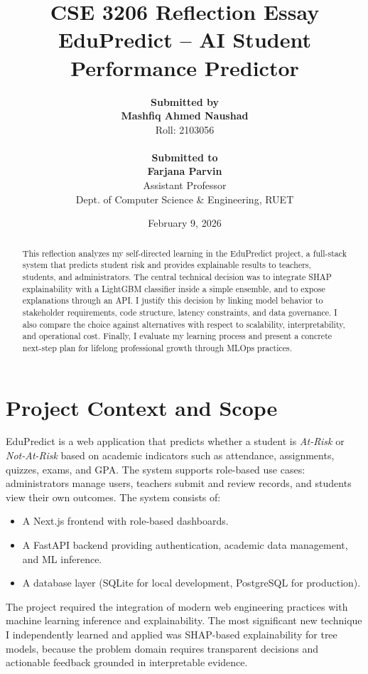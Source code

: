 \documentclass[12pt]{article}
\title{\textbf{CSE 3206 Reflection Essay} \\[0.5cm] EduPredict -- AI Student Performance Predictor}
\author{\textbf{Submitted by}\\\textbf{Mashfiq Ahmed Naushad}\\Roll: 2103056\\\\[0.6cm]
\textbf{Submitted to}\\\textbf{Farjana Parvin}\\Assistant Professor\\Dept. of Computer Science \& Engineering, RUET}
\date{February 9, 2026}
\begin{document}
\maketitle
\vspace{1.2cm}
\begin{abstract}
This reflection analyzes my self-directed learning in the EduPredict project, a full-stack system that predicts student risk and provides explainable results to teachers, students, and administrators. The central technical decision was to integrate SHAP explainability with a LightGBM classifier inside a simple ensemble, and to expose explanations through an API. I justify this decision by linking model behavior to stakeholder requirements, code structure, latency constraints, and data governance. I also compare the choice against alternatives with respect to scalability, interpretability, and operational cost. Finally, I evaluate my learning process and present a concrete next-step plan for lifelong professional growth through MLOps practices.
\end{abstract}
\newpage
\tableofcontents
\newpage


\section{Project Context and Scope}
EduPredict is a web application that predicts whether a student is \textit{At-Risk} or \textit{Not-At-Risk} based on academic indicators such as attendance, assignments, quizzes, exams, and GPA. The system supports role-based use cases: administrators manage users, teachers submit and review records, and students view their own outcomes. The system consists of:
\begin{itemize}
  \item A Next.js frontend with role-based dashboards.
  \item A FastAPI backend providing authentication, academic data management, and ML inference.
  \item A database layer (SQLite for local development, PostgreSQL for production).
\end{itemize}

The project required the integration of modern web engineering practices with machine learning inference and explainability. The most significant new technique I independently learned and applied was SHAP-based explainability for tree models, because the problem domain requires transparent decisions and actionable feedback grounded in interpretable evidence.
\end{document}
